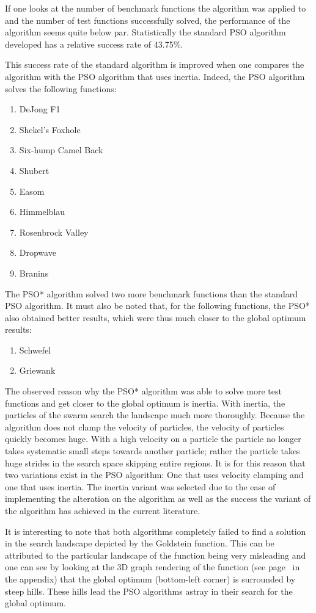 If one looks at the number of benchmark functions the algorithm was applied to and the number of test functions successfully solved, the performance of the algorithm seems quite below par. Statistically the standard PSO algorithm developed has a relative success rate of 43.75\%.

This success rate of the standard algorithm is improved when one compares the algorithm with the PSO algorithm that uses inertia. Indeed, the PSO algorithm solves the following functions:
\begin{enumerate}
\item DeJong F1 
\item Shekel's Foxhole
\item Six-hump Camel Back
\item Shubert
\item Easom
\item Himmelblau
\item Rosenbrock Valley
\item Dropwave
\item Branins
\end{enumerate}
The PSO* algorithm solved two more benchmark functions than the standard PSO algorithm. It must also be noted that, for the following functions, the PSO* also obtained better results, which were thus much closer to the global optimum results:
\begin{enumerate}
\item Schwefel
\item Griewank
\end{enumerate}
The observed reason why the PSO* algorithm was able to solve more test functions and get closer to the global optimum is inertia. With inertia, the particles of the swarm search the landscape much more thoroughly. Because the algorithm does not clamp the velocity of particles, the velocity of particles quickly becomes huge. With a high velocity on a particle the particle no longer takes systematic small steps towards another particle; rather the particle takes huge strides in the search space skipping entire regions. It is for this reason that two variations exist in the PSO algorithm: One that uses velocity clamping and one that uses inertia. The inertia variant was selected due to the ease of implementing the alteration on the algorithm as well as the success the variant of the algorithm has achieved in the current literature.

It is interesting to note that both algorithms completely failed to find a solution in the search landscape depicted by the Goldstein function. This can be attributed to the particular landscape of the function being very misleading and one can see by looking at the 3D graph rendering of the function (see page~\pageref{fig:GoldsteinGraph} in the appendix) that the global optimum (bottom-left corner) is surrounded by steep hills. These hills lead the PSO algorithms astray in their search for the global optimum.

